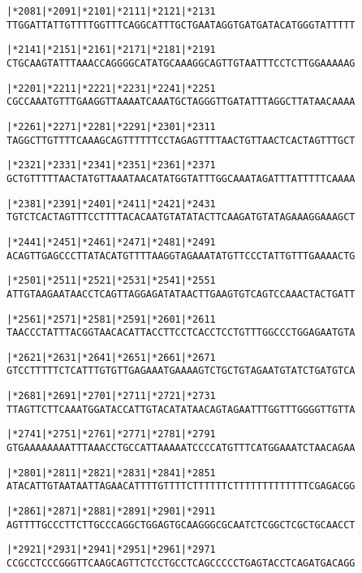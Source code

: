 \documentclass{article}
\begin{document}
\begin{alltt}
   |*2081    |*2091    |*2101    |*2111    |*2121    |*2131 
TTGGATTATTGTTTTGGTTTCAGGCATTTGCTGAATAGGTGATGATACATGGGTATTTTT

   |*2141    |*2151    |*2161    |*2171    |*2181    |*2191 
CTGCAAGTATTTAAACCAGGGGCATATGCAAAGGCAGTTGTAATTTCCTCTTGGAAAAAG

   |*2201    |*2211    |*2221    |*2231    |*2241    |*2251 
CGCCAAATGTTTGAAGGTTAAAATCAAATGCTAGGGTTGATATTTAGGCTTATAACAAAA

   |*2261    |*2271    |*2281    |*2291    |*2301    |*2311 
TAGGCTTGTTTTCAAAGCAGTTTTTTCCTAGAGTTTTAACTGTTAACTCACTAGTTTGCT

   |*2321    |*2331    |*2341    |*2351    |*2361    |*2371 
GCTGTTTTTAACTATGTTAAATAACATATGGTATTTGGCAAATAGATTTATTTTTCAAAA

   |*2381    |*2391    |*2401    |*2411    |*2421    |*2431 
TGTCTCACTAGTTTCCTTTTACACAATGTATATACTTCAAGATGTATAGAAAGGAAAGCT

   |*2441    |*2451    |*2461    |*2471    |*2481    |*2491 
ACAGTTGAGCCCTTATACATGTTTTAAGGTAGAAATATGTTCCCTATTGTTTGAAAACTG

   |*2501    |*2511    |*2521    |*2531    |*2541    |*2551 
ATTGTAAGAATAACCTCAGTTAGGAGATATAACTTGAAGTGTCAGTCCAAACTACTGATT

   |*2561    |*2571    |*2581    |*2591    |*2601    |*2611 
TAACCCTATTTACGGTAACACATTACCTTCCTCACCTCCTGTTTGGCCCTGGAGAATGTA

   |*2621    |*2631    |*2641    |*2651    |*2661    |*2671 
GTCCTTTTTCTCATTTGTGTTGAGAAATGAAAAGTCTGCTGTAGAATGTATCTGATGTCA

   |*2681    |*2691    |*2701    |*2711    |*2721    |*2731 
TTAGTTCTTCAAATGGATACCATTGTACATATAACAGTAGAATTTGGTTTGGGGTTGTTA

   |*2741    |*2751    |*2761    |*2771    |*2781    |*2791 
GTGAAAAAAAATTTAAACCTGCCATTAAAAATCCCCATGTTTCATGGAAATCTAACAGAA

   |*2801    |*2811    |*2821    |*2831    |*2841    |*2851 
ATACATTGTAATAATTAGAACATTTTGTTTTCTTTTTTCTTTTTTTTTTTTTCGAGACGG

   |*2861    |*2871    |*2881    |*2891    |*2901    |*2911 
AGTTTTGCCCTTCTTGCCCAGGCTGGAGTGCAAGGGCGCAATCTCGGCTCGCTGCAACCT

   |*2921    |*2931    |*2941    |*2951    |*2961    |*2971 
CCGCCTCCCGGGTTCAAGCAGTTCTCCTGCCTCAGCCCCCTGAGTACCTCAGATGACAGG

\end{alltt}
\newpage
\end{document}
